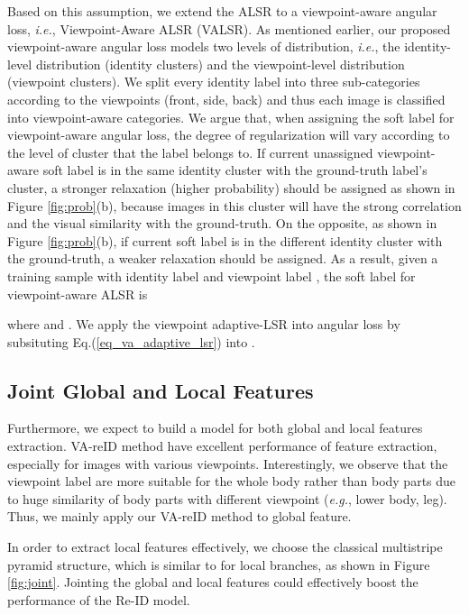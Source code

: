 \documentclass[letterpaper]{article} \usepackage{aaai20}  \usepackage{times}  \usepackage{helvet} \usepackage{courier}  \usepackage[hyphens]{url}  \usepackage{graphicx} \usepackage{array}
\begin{document}
Based on this assumption, we extend the ALSR to a viewpoint-aware angular loss, \textit{i.e.}, Viewpoint-Aware ALSR (VALSR). As mentioned earlier, our proposed viewpoint-aware angular loss models two levels of distribution, \textit{i.e.}, the identity-level distribution (identity clusters) and the viewpoint-level distribution (viewpoint clusters). We split every identity label into three sub-categories according to the viewpoints (front, side, back) and thus each image is classified into  viewpoint-aware categories. We argue that, when assigning the soft label for viewpoint-aware angular loss, the degree of regularization will vary according to the level of cluster that the label belongs to. If current unassigned viewpoint-aware soft label is in the same identity cluster with the ground-truth label's cluster, a stronger relaxation (higher probability) should be assigned as shown in Figure \ref{fig:prob}(b), because images in this cluster will have the strong correlation and the visual similarity with the ground-truth. On the opposite, as shown in Figure \ref{fig:prob}(b), if current soft label is in the different identity cluster with the ground-truth, a weaker relaxation should be assigned. As a result, given a training sample  with identity label  and viewpoint label , the soft label for viewpoint-aware ALSR is

where  and . We apply the viewpoint adaptive-LSR into angular loss by subsituting Eq.(\ref{eq_va_adaptive_lsr}) into . 



\subsection{Joint Global and Local Features}
Furthermore, we expect to build a model for both global and local features extraction. VA-reID method have excellent performance of feature extraction, especially for images with various viewpoints. Interestingly, we observe that the viewpoint label are more suitable for the whole body rather than body parts due to huge similarity of body parts with different viewpoint (\textit{e.g.}, lower body, leg). Thus, we mainly apply our VA-reID method to global feature. 


In order to extract local features effectively, we choose the classical multistripe pyramid structure, which is similar to \cite{Sun_2018_ECCV,Zheng_2019_CVPR} for local branches, as shown in Figure \ref{fig:joint}. Jointing the global and local features could effectively boost the performance of the Re-ID model. 
\end{document}
